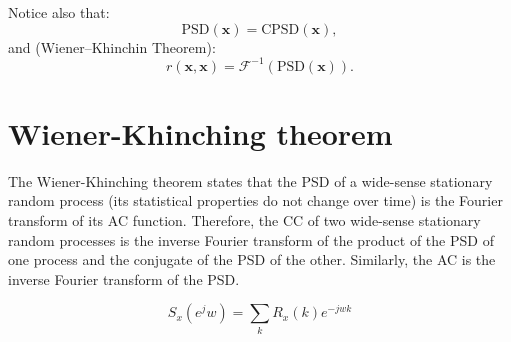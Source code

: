 Notice also that:
\begin{equation}
  \text{PSD}(\mathbf{x}) = \text{CPSD}(\mathbf{x}),
\end{equation}
and (Wiener–Khinchin Theorem):
\begin{equation}
  r(\mathbf{x},\mathbf{x}) = \mathcal{F}^{-1}(\text{PSD}(\mathbf{x})).
\end{equation}


\section{Wiener-Khinching theorem}
\label{sec:WKT}

The Wiener-Khinching theorem states that the \gls{PSD} of a wide-sense
stationary random process (its statistical properties do not change
over time) is the Fourier transform of its \gls{AC}
function. Therefore, the \gls{CC} of two wide-sense stationary random
processes is the inverse Fourier transform of the product of the
\gls{PSD} of one process and the conjugate of the \gls{PSD} of the
other. Similarly, the \gls{AC} is the inverse Fourier transform
of the \gls{PSD}.

\begin{equation}
  S_x(e^jw)=\sum_kR_x(k)e^{-jwk}
\end{equation}


